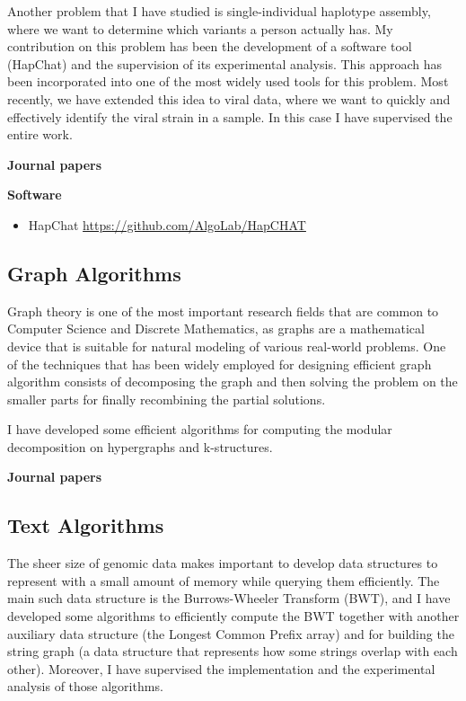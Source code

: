 \documentclass[11pt,a4paper,roman]{moderncv}
\begin{document}
Another problem that I have studied is single-individual haplotype assembly, where we want to
determine which variants a person actually has.
My contribution on this problem has been the development of a software tool
(HapChat) and the supervision of its experimental analysis.
This approach has been incorporated into one of the most widely used tools for
this problem.
Most recently, we have extended this idea to viral data, where we want to
quickly and effectively identify the viral strain in a sample.
In this case I have supervised the entire work.


\textbf{Journal papers}

\cite{ciccolellaMALVIRUSIntegratedApplication2022}
\cite{DBLP:journals/bmcbi/BerettaPZVB18}
\cite{DBLP:journals/tcbb/PirolaVBSB12}
\cite{DBLP:journals/tcbb/BonizzoniVDPR10}
\cite{DBLP:journals/ijbra/BonizzoniVDM05}
\cite{DBLP:journals/jcst/BonizzoniVDL03}

\textbf{Software}

\begin{itemize}
	\item
	      HapChat \url{https://github.com/AlgoLab/HapCHAT}
\end{itemize}

\subsection{Graph Algorithms}\label{graph-algorithms}

Graph theory is one of the most
important research fields that are common to Computer Science and
Discrete Mathematics, as graphs are a mathematical device that is
suitable for natural modeling of various real-world problems. One of the
techniques that has been widely employed for designing efficient graph
algorithm consists of decomposing the graph and then solving the problem
on the smaller parts for finally recombining the partial solutions.

I have developed some efficient algorithms for
computing the modular decomposition on hypergraphs and k-structures.


\textbf{Journal papers}

\cite{DBLP:journals/jal/BonizzoniV99}


\subsection{Text Algorithms}\label{bwt}

The sheer size of genomic data makes important to develop data structures to
represent with a small amount of memory while querying them efficiently.
The main such data structure is the Burrows-Wheeler Transform (BWT), and I have
developed some algorithms to efficiently compute the BWT together with another
auxiliary data structure (the Longest Common Prefix array) and for building the
string graph (a data structure that represents how some strings overlap with
each other).
Moreover, I have supervised the implementation and the experimental analysis of
those algorithms.
\end{document}
